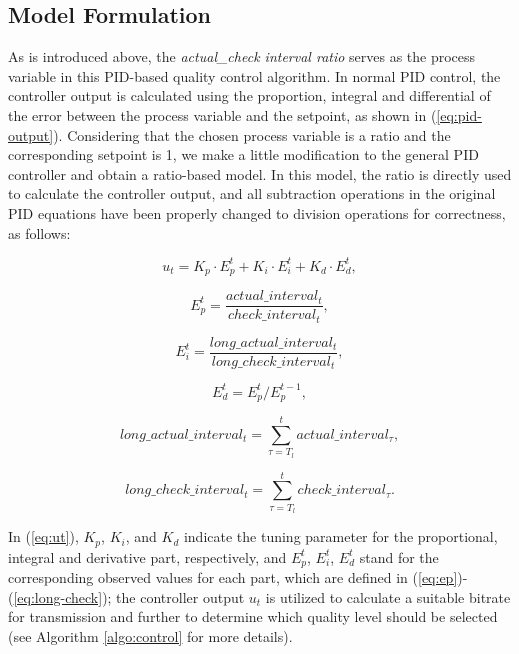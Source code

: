 \documentclass[journal]{IEEEtran}
\begin{document}
\subsection{Model Formulation}
\label{subsec:model-formulation}

As is introduced above, the \textit{actual\_check interval ratio} serves as the process variable in this PID-based quality control algorithm. In normal PID control, the controller output is calculated using the proportion, integral and differential of the error between the process variable and the setpoint, as shown in (\ref{eq:pid-output}). Considering that the chosen process variable is a ratio and the corresponding setpoint is 1, we make a little modification to the general PID controller and obtain a ratio-based model. In this model, the ratio is directly used to calculate the controller output, and all subtraction operations in the original PID equations have been properly changed to division operations for correctness, as follows:

\begin{equation}
\label{eq:ut}
{u_t} = {K_p} \cdot E_p^t + {K_i} \cdot E_i^t + {K_d} \cdot E_d^t ,
\end{equation}

\begin{equation}
\label{eq:ep}
E_p^t = \frac{{actual\_interva{l_t}}}{{check\_interva{l_t}}} ,
\end{equation}

\begin{equation}
\label{eq:ei}
E_i^t = \frac{{long\_actual\_interva{l_t}}}{{long\_check\_interva{l_t}}} ,
\end{equation}

\begin{equation}
\label{eq:ed}
E_d^t = E_p^t/E_p^{t - 1} ,
\end{equation}

\begin{equation}
\label{eq:long-actual}
long\_actual\_interva{l_t} = \sum\limits_{\tau = {T_l}}^t {actual\_interva{l_\tau}} ,
\end{equation}

\begin{equation}
\label{eq:long-check}
long\_check\_interva{l_t} = \sum\limits_{\tau = {T_l}}^t {check\_interva{l_\tau}} .
\end{equation}


In (\ref{eq:ut}), $K_p$, $K_i$, and $K_d$ indicate the tuning parameter for the proportional, integral and derivative part, respectively, and $E_p^t$, $E_i^t$, $E_d^t$ stand for the corresponding observed values for each part, which are defined in (\ref{eq:ep})-(\ref{eq:long-check}); the controller output $u_t$ is utilized to calculate a suitable bitrate for transmission and further to determine which quality level should be selected (see Algorithm \ref{algo:control} for more details).
\end{document}

